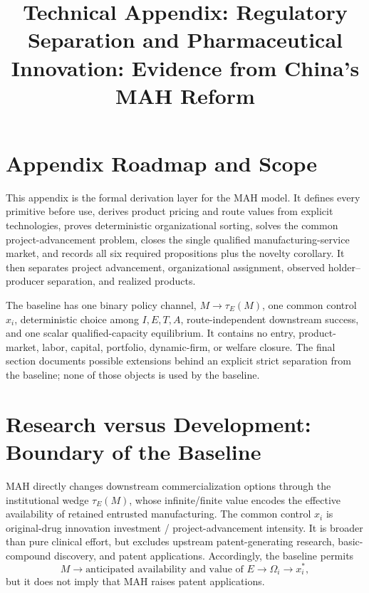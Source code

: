 \documentclass[11pt]{article}
\title{Technical Appendix: Regulatory Separation and Pharmaceutical Innovation: Evidence from China's MAH Reform}
\author{}
\date{}
\newcommand{\1}{\mathbf{1}}
\begin{document}
\maketitle
\thispagestyle{plain}

\newpage
\tableofcontents
\newpage
\small

\section{Appendix Roadmap and Scope}
\label{sec:appendix-roadmap}

This appendix is the formal derivation layer for the MAH model. It
defines every primitive before use, derives product pricing and route values
from explicit technologies, proves deterministic organizational sorting,
solves the common project-advancement problem, closes the single qualified
manufacturing-service market, and records all six required propositions plus
the novelty corollary. It then separates project advancement, organizational
assignment, observed holder--producer separation, and realized products.

The baseline has one binary policy channel, \(M\to\tau_E(M)\), one common
control \(x_i\), deterministic choice among \(I,E,T,A\), route-independent
downstream success, and one scalar qualified-capacity equilibrium. It contains
no entry, product-market, labor, capital, portfolio, dynamic-firm, or welfare
closure. The final section documents possible extensions behind an explicit
strict separation from the baseline; none of those objects is used by the baseline.












\section{Research versus Development: Boundary of the Baseline}
\label{sec:appendix-research-development-boundary}

MAH directly changes downstream commercialization options through the
institutional wedge \(\tau_E(M)\), whose infinite/finite value encodes the
effective availability of retained entrusted manufacturing. The common
control \(x_i\) is original-drug innovation investment /
project-advancement intensity. It is broader than pure clinical effort, but
excludes upstream patent-generating research, basic-compound discovery, and
patent applications. Accordingly, the baseline permits
\[
  M
  \longrightarrow
  \text{anticipated availability and value of }E
  \longrightarrow
  \Omega_i
  \longrightarrow
  x_i^*,
\]
but it does not imply that MAH raises patent applications.
\end{document}
